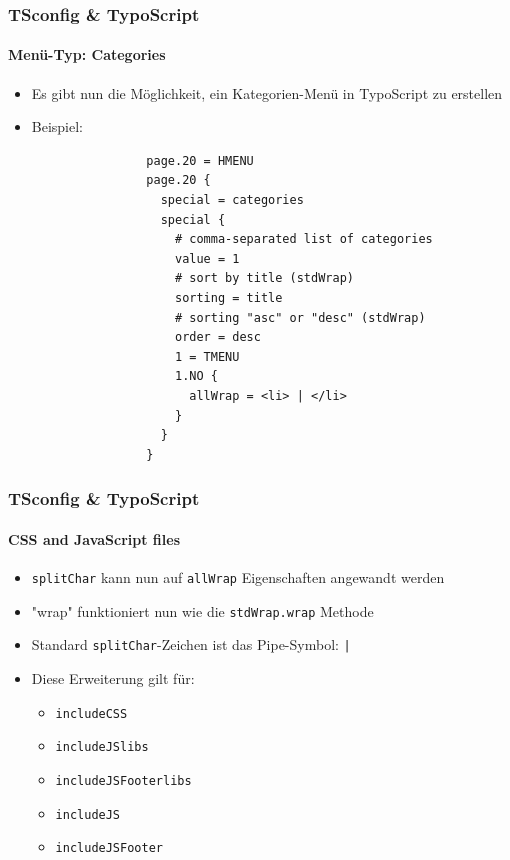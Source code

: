 
\begin{frame}[fragile]
	\frametitle{TSconfig \& TypoScript}
	\framesubtitle{Menü-Typ: Categories}

	\begin{itemize}
		\item Es gibt nun die Möglichkeit, ein Kategorien-Menü in TypoScript zu erstellen

		\item Beispiel:

			\lstset{
				basicstyle=\tiny\ttfamily
			}

			\begin{lstlisting}
				page.20 = HMENU
				page.20 {
				  special = categories
				  special {
				    # comma-separated list of categories
				    value = 1
				    # sort by title (stdWrap)
				    sorting = title
				    # sorting "asc" or "desc" (stdWrap)
				    order = desc
				    1 = TMENU
				    1.NO {
				      allWrap = <li> | </li>
				    }
				  }
				}
			\end{lstlisting}

	\end{itemize}

\end{frame}


\begin{frame}[fragile]
	\frametitle{TSconfig \& TypoScript}
	\framesubtitle{CSS and JavaScript files}

	\begin{itemize}
		\item \texttt{splitChar} kann nun auf \texttt{allWrap} Eigenschaften angewandt werden
		\item "wrap" funktioniert nun wie die \texttt{stdWrap.wrap} Methode
		\item Standard \texttt{splitChar}-Zeichen ist das Pipe-Symbol: \texttt{|}
		\item Diese Erweiterung gilt für:

			\begin{itemize}
				\item \texttt{includeCSS}
				\item \texttt{includeJSlibs}
				\item \texttt{includeJSFooterlibs}
				\item \texttt{includeJS}
				\item \texttt{includeJSFooter}
			\end{itemize}

	\end{itemize}

\end{frame}


